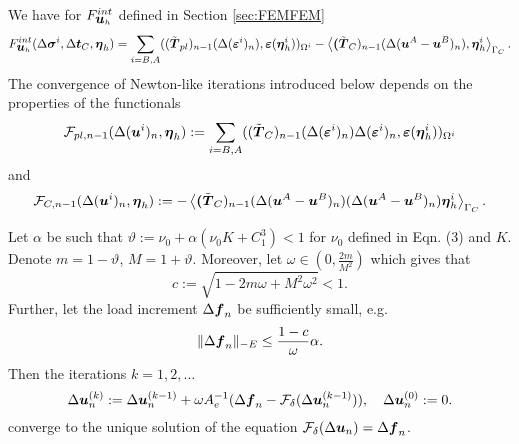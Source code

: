 \documentclass[12pt,a4paper]{scrbook}
\begin{document}
We have for $F^{int}_{\mbox{\boldmath$u$}_h}$ defined in  Section \ref{sec:FEMFEM}
\begin{equation}
F^{int}_{\mbox{\boldmath$u$}_{h}}(\Delta \mbox{\boldmath$\sigma$}^i,\Delta \mbox{\boldmath$t$}_{C},\mbox{\boldmath$\eta$}_h) = \sum_{i=B,A} ( (\tilde{\mbox{\boldmath$T$}}_{pl})_{n-1}(\Delta(\mbox{\boldmath$\varepsilon$}^i)_{n}), \mbox{\boldmath$\varepsilon$}(\mbox{\boldmath$\eta$}^i_h))_{\Omega^i}
- \left\langle \mbox{\boldmath$($}\tilde{\mbox{\boldmath$T$}}_{C})_{n-1}(\Delta(\mbox{\boldmath$u$}^{A}-\mbox{\boldmath$u$}^{B})_{n}), \mbox{\boldmath$\eta$}^i_h\right\rangle_{\Gamma_C}. \\
\end{equation}
The convergence of Newton-like  iterations introduced below depends on the properties of the functionals 
\begin{equation}
\mathcal{F}_{pl,n-1}(\Delta(\mbox{\boldmath$u$}^i)_{n},\mbox{\boldmath$\eta$}_h):=\sum_{i=B,A} ( (\tilde{\mbox{\boldmath$T$}}_{C})_{n-1}(\Delta(\mbox{\boldmath$\varepsilon$}^i)_{n})\Delta(\mbox{\boldmath$\varepsilon$}^i)_{n}, \mbox{\boldmath$\varepsilon$}(\mbox{\boldmath$\eta$}^i_h))_{\Omega^i}
\end{equation}
 and 
\begin{equation}
\mathcal{F}_{C,n-1}(\Delta(\mbox{\boldmath$u$}^i)_{n},\mbox{\boldmath$\eta$}_h):=- \left\langle \mbox{\boldmath$($}\tilde{\mbox{\boldmath$T$}}_{C})_{n-1}(\Delta(\mbox{\boldmath$u$}^{A}-\mbox{\boldmath$u$}^{B})_{n})(\Delta(\mbox{\boldmath$u$}^{A}-\mbox{\boldmath$u$}^{B})_{n})\mbox{\boldmath$\eta$}^i_h\right\rangle_{\Gamma_C}.
\end{equation}


\begin{thm}\label{thm:NLI:MechanicalElPlContactFunctional:Solvability}
Let $\alpha$ be such that $\vartheta:=\nu_0+\alpha(\nu_0 K + C^{3}_1)< 1$ for $\nu_0$ defined in \cite{BlAx97} Eqn. (3) and $K$. Denote $m=1-\vartheta$, $M=1+\vartheta$. Moreover, let $\omega \in (0,\frac{2m}{M^2})$ which gives that
\begin{equation}\nonumber
c:=\sqrt{1-2 m \omega +M^2 \omega^2} < 1.
\end{equation}
Further, let the load increment  $\Delta \mbox{\boldmath$f$}_{n}$ be sufficiently small, e.g.
\begin{equation}\nonumber
\|\Delta \mbox{\boldmath$f$}_{n}\|_{-E}\leq \frac{1-c}{\omega} \alpha.
\end{equation}
Then the iterations  $k=1,2,\ldots$
\begin{equation}\label{eq:NLI:Iterations}
\Delta \mbox{\boldmath$u$}^{(k)}_{n}:=\Delta \mbox{\boldmath$u$}^{(k-1)}_{n}+\omega A^{-1}_{e}(\Delta \mbox{\boldmath$f$}_{n}-\mathcal{F}_{\delta}(\Delta \mbox{\boldmath$u$}^{(k-1)}_{n})),\quad \Delta \mbox{\boldmath$u$}^{(0)}_{n}:=0.
\end{equation}
converge to the unique solution of the equation $\mathcal{F}_{\delta}(\Delta \mbox{\boldmath$u$}_{n})=\Delta \mbox{\boldmath$f$}_{n}$.
\end{thm}
\end{document}
